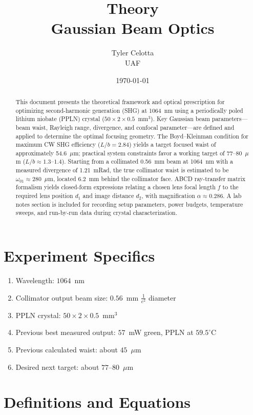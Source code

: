 \documentclass[11pt, letterpaper]{article}
\title{\textbf{Theory}\\ \large Gaussian Beam Optics}
\author{Tyler Celotta \\ UAF}
\date{\today}
\begin{document}
\maketitle
\thispagestyle{fancy}

\begin{abstract}
This document presents the theoretical framework and optical prescription for optimizing
second-harmonic generation (SHG) at 1064~nm using a periodically poled lithium niobate
(PPLN) crystal ($50 \times 2 \times 0.5$~mm$^3$).
Key Gaussian beam parameters---beam waist, Rayleigh range, divergence, and confocal
parameter---are defined and applied to determine the optimal focusing geometry.
The Boyd--Kleinman condition for maximum CW SHG efficiency ($L/b = 2.84$) yields a
target focused waist of approximately 54.6~$\mu$m; practical system constraints favor a
working target of 77--80~$\mu$m ($L/b \approx 1.3$--$1.4$).
Starting from a collimated 0.56~mm beam at 1064~nm with a measured divergence of
1.21~mRad, the true collimator waist is estimated to be $\omega_{01} \approx 280$~$\mu$m,
located 6.2~mm behind the collimator face.
ABCD ray-transfer matrix formalism yields closed-form expressions relating a chosen lens
focal length $f$ to the required lens position $d_1$ and image distance $d_2$, with
magnification $\alpha \approx 0.286$.
A lab notes section is included for recording setup parameters, power budgets, temperature
sweeps, and run-by-run data during crystal characterization.
\end{abstract}

\section{Experiment Specifics}
\begin{enumerate}
    \item Wavelength: $1064$~nm
    \item Collimator output beam size: $0.56$~mm $\frac{1}{e^2}$ diameter
    \item PPLN crystal: $50 \times 2 \times 0.5$~mm$^3$
    \item Previous best measured output: $57$~mW green, PPLN at $59.5^{\circ}$C
    \item Previous calculated waist: about $45$~$\mu$m
    \item Desired next target: about $77$--$80$~$\mu$m
\end{enumerate}

\section{Definitions and Equations}
\end{document}

